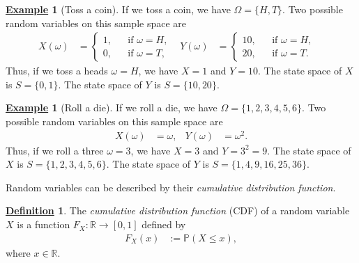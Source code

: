 \documentclass[12pt]{book}
\numberwithin{equation}{chapter}
\theoremstyle{plain}
\numberwithin{theorem}{section}
\theoremstyle{definition}
\newtheorem{definition}[theorem]{\underline{Definition}}
\newtheorem{example}[theorem]{\underline{Example}}
\numberwithin{exercise}{chapter}
\newcommand{\<}{\langle}
\renewcommand{\>}{\rangle}
\renewcommand{\(}{\left(}
\renewcommand{\)}{\right)}
\renewcommand{\[}{\left[}
\renewcommand{\]}{\right]}
\newcommand\Pb{\mathds{P}}
\newcommand\Rb{\mathds{R}}
\newcommand\om{\omega}
\newcommand\Om{\Omega}
\theoremstyle{definition}
\numberwithin{question}{section}
\begin{document}
\begin{example}[Toss a coin]
\label{ex:coin.toss.rvs}
If we toss a coin, we have $\Om = \{H,T\}$.  Two possible random variables on this sample space are
\begin{align}
X(\om)
	&=	\left\{ \begin{aligned}
			1 , & & \text{if $\om = H$} , \\
			0 , & & \text{if $\om = T$} ,
			\end{aligned} \right. &
Y(\om)
	&=	\left\{ \begin{aligned}
			10 , & & \text{if $\om = H$} , \\
			20 , & & \text{if $\om = T$} .
			\end{aligned} \right. &
\end{align}
Thus, if we toss a heads $\om = H$, we have $X = 1$ and $Y = 10$.
The state space of $X$ is $S = \{0,1\}$.  The state space of $Y$ is $S = \{10,20\}$.
\end{example}

\begin{example}[Roll a die]
\label{ex:dice-roll}
If we roll a die, we have $\Om = \{1,2,3,4,5,6\}$.  Two possible random variables on this sample space are
\begin{align}
X(\om)
	&=	\om , &
Y(\om)
	&=	\om^2 .
\end{align}
Thus, if we roll a three $\om = 3$, we have $X = 3$ and $Y = 3^2 = 9$.
The state space of $X$ is $S = \{1,2,3,4,5,6\}$.  The state space of $Y$ is $S = \{1,4,9,16,25,36\}$.
\end{example}

\noindent
Random variables can be described by their \textit{cumulative distribution function}.

\begin{definition}
\label{def:cdf}
The \textit{cumulative distribution function} (CDF) of a random variable $X$ is a function $F_X : \Rb \to [0,1]$ defined by
\begin{align}
F_X(x)
	&:= \Pb( X \leq x ) , \label{eq:cdf}
\end{align}
where $x \in \Rb$.
\end{definition}
\end{document}
